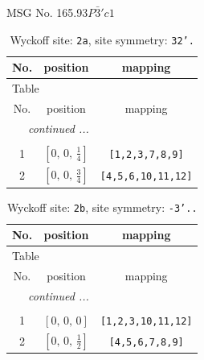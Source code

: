 \documentclass[fleqn,8pt]{jsarticle}
\begin{document}
\setcounter{MaxMatrixCols}{32}

\renewcommand{\tablename}{Table~}
\renewcommand{\figurename}{Figure~}
\begin{center}
\LARGE
MSG No. 165.93\quad$P\bar{3}'c1$
\end{center}
\renewcommand{\arraystretch}{1.2}
\begin{longtable}{ccc}
\caption{Wyckoff site: {\tt 2a}, site symmetry: {\tt 32'.}}
 \\
 \hline \hline
No. & position & mapping \\ \hline \endfirsthead

\multicolumn{2}{l}{\tablename\ \thetable{}} \\
 \hline \hline
No. & position & mapping \\ \hline \endhead

 \hline \hline
\multicolumn{2}{r}{\footnotesize\it continued ...} \\ \endfoot

 \hline \hline
\multicolumn{2}{r}{} \\ \endlastfoot

1 & $\left[ 0,\, 0,\, \frac{1}{4} \right]$ & {\tt [1,2,3,7,8,9]} \\ \hline
2 & $\left[ 0,\, 0,\, \frac{3}{4} \right]$ & {\tt [4,5,6,10,11,12]} \\
\end{longtable}
\renewcommand{\arraystretch}{1.2}
\begin{longtable}{ccc}
\caption{Wyckoff site: {\tt 2b}, site symmetry: {\tt -3'..}}
 \\
 \hline \hline
No. & position & mapping \\ \hline \endfirsthead

\multicolumn{2}{l}{\tablename\ \thetable{}} \\
 \hline \hline
No. & position & mapping \\ \hline \endhead

 \hline \hline
\multicolumn{2}{r}{\footnotesize\it continued ...} \\ \endfoot

 \hline \hline
\multicolumn{2}{r}{} \\ \endlastfoot

1 & $\left[ 0,\, 0,\, 0 \right]$ & {\tt [1,2,3,10,11,12]} \\ \hline
2 & $\left[ 0,\, 0,\, \frac{1}{2} \right]$ & {\tt [4,5,6,7,8,9]} \\
\end{longtable}
\end{document}
